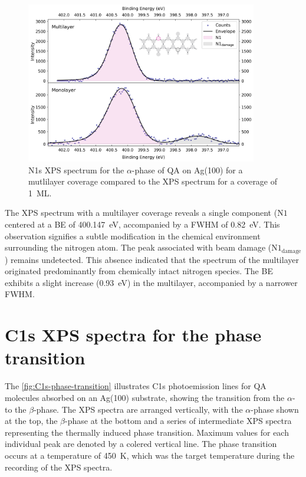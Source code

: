 \begin{figure}[H]
	\centering
	\includegraphics[width=0.9\textwidth]{images/N1s-multilayer.png}
	\caption{N1s \ac{XPS} spectrum for the $\alpha$-phase of \ac{QA} on Ag(100) for a mutlilayer coverage compared to the \ac{XPS} spectrum for a coverage of 1~\ac{ML}.}
	\label{fig:N1s-alpha-multilayer}
\end{figure}

The \ac{XPS} spectrum with a multilayer coverage reveals a single component ($\mathrm{N1}$ centered at a \ac{BE} of 400.147~\si{\eV}, accompanied by a \ac{FWHM} of 0.82~\si{\eV}. This observation signifies a subtle modification in the chemical environment surrounding the nitrogen atom. The peak associated with beam damage ($\mathrm{N1_{damage}}$) remains undetected. This absence indicated that the spectrum of the multilayer originated predominantly from chemically intact nitrogen species. The \ac{BE} exhibits a slight increase (0.93~\si{\eV}) in the multilayer, accompanied by a narrower \ac{FWHM}.


\cleardoublepage
\section{C1s XPS spectra for the phase transition}
\label{sec:res-phase-transition}

The \autoref{fig:C1s-phase-transition} illustrates C1s photoemission lines for \ac{QA} molecules absorbed on an Ag(100) substrate, showing the transition from the $\alpha$- to the $\beta$-phase. The \ac{XPS} spectra are arranged vertically, with the $\alpha$-phase shown at the top, the $\beta$-phase at the bottom and a series of intermediate \ac{XPS} spectra representing the thermally induced phase transition. Maximum values for each individual peak are denoted by a colered vertical line. The phase transition occurs at a temperature of 450~\si{K}, which was the target temperature during the recording of the \ac{XPS} spectra.

